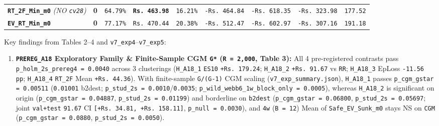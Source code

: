 \documentclass[11pt,a4paper]{article}
\begin{document}
\begin{table}[htbp]
{\begin{tabular}{lrrrrrrrr}
\textbf{\texttt{RT\_2F\_Min\_m0}} \textit{(NO \texttt{cv28})} & \textbf{0} & \texttt{64.79\%} & \textbf{\texttt{Rs.\,463.98}} & \texttt{16.21\%} & \texttt{-Rs.\,464.84} & \texttt{-Rs.\,618.35} & \texttt{-Rs.\,323.98} & \texttt{177.52} \\
\textbf{\texttt{EV\_RT\_Min\_m0}} & \textbf{0} & \texttt{77.17\%} & \texttt{Rs.\,470.44} & \texttt{20.38\%} & \texttt{-Rs.\,512.47} & \texttt{-Rs.\,602.97} & \texttt{-Rs.\,307.16} & \texttt{191.18} \\
\bottomrule
\end{tabular}}
\end{table}

Key findings from Tables 2--4 and \texttt{v7\_exp4}--\texttt{v7\_exp5}:

\begin{enumerate}
  \item \textbf{\texttt{PREREG\_A18} Exploratory Family \& Finite-Sample CGM \texttt{G*} (\texttt{R = 2,000}, Table 3):} All 4 pre-registered contrasts pass \texttt{p\_holm\_2s\_prereg4 = 0.0040} across 3 clusterings (\texttt{H\_A18\_1} \texttt{ES10} \texttt{+Rs.\,179.24}; \texttt{H\_A18\_2} \texttt{+Rs.\,91.67} vs \texttt{RR}; \texttt{H\_A18\_3} EpLoss \texttt{-11.56 pp}; \texttt{H\_A18\_4} \texttt{RT\_2F} Mean \texttt{+Rs.\,44.36}). With finite-sample \texttt{G/(G-1)} CGM scaling (\texttt{v7\_exp\_summary.json}), \texttt{H\_A18\_1} passes \texttt{p\_cgm\_gstar = 0.00511} (\texttt{0.01001} b2dest; \texttt{p\_stud\_2s = 0.0010}/\texttt{0.0035}; \texttt{p\_wild\_webb6\_1w\_block\_only = 0.0005}), whereas \texttt{H\_A18\_2} is significant on origin (\texttt{p\_cgm\_gstar = 0.04887}, \texttt{p\_stud\_2s = 0.01199}) and borderline on \texttt{b2dest} (\texttt{p\_cgm\_gstar = 0.06800}, \texttt{p\_stud\_2s = 0.05697}; joint \texttt{val+test} \texttt{91.67} CI \texttt{[+Rs.\,34.81, +Rs.\,158.11]}, \texttt{p\_null = 0.0030}), and \texttt{4w} (\texttt{B = 12}) Mean of \texttt{Safe\_EV\_Sunk\_m0} stays NS on \texttt{CGM} (\texttt{p\_cgm\_gstar = 0.0880}, \texttt{p\_stud\_2s = 0.0050}).

\end{enumerate}
\end{document}
